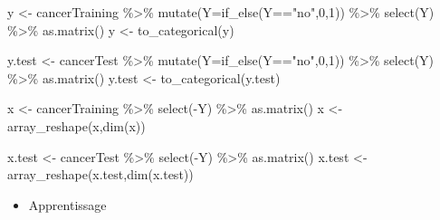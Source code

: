 \documentclass[
  12pt,
]{article}
\newenvironment{Shaded}{\begin{snugshade}}{\end{snugshade}}
\newcommand{\AttributeTok}[1]{\textcolor[rgb]{0.77,0.63,0.00}{#1}}
\newcommand{\DecValTok}[1]{\textcolor[rgb]{0.00,0.00,0.81}{#1}}
\newcommand{\FunctionTok}[1]{\textcolor[rgb]{0.00,0.00,0.00}{#1}}
\newcommand{\NormalTok}[1]{#1}
\newcommand{\OtherTok}[1]{\textcolor[rgb]{0.56,0.35,0.01}{#1}}
\newcommand{\SpecialCharTok}[1]{\textcolor[rgb]{0.00,0.00,0.00}{#1}}
\newcommand{\StringTok}[1]{\textcolor[rgb]{0.31,0.60,0.02}{#1}}
\providecommand{\tightlist}{%
  \setlength{\itemsep}{0pt}\setlength{\parskip}{0pt}}
\begin{document}
\begin{Shaded}
\begin{Highlighting}[]
\NormalTok{y }\OtherTok{\textless{}{-}}\NormalTok{  cancerTraining }\SpecialCharTok{\%\textgreater{}\%} 
  \FunctionTok{mutate}\NormalTok{(}\AttributeTok{Y=}\FunctionTok{if\_else}\NormalTok{(Y}\SpecialCharTok{==}\StringTok{"no"}\NormalTok{,}\DecValTok{0}\NormalTok{,}\DecValTok{1}\NormalTok{)) }\SpecialCharTok{\%\textgreater{}\%} 
  \FunctionTok{select}\NormalTok{(Y)  }\SpecialCharTok{\%\textgreater{}\%} 
  \FunctionTok{as.matrix}\NormalTok{()}
\NormalTok{y }\OtherTok{\textless{}{-}} \FunctionTok{to\_categorical}\NormalTok{(y)}

\NormalTok{y.test }\OtherTok{\textless{}{-}}\NormalTok{  cancerTest }\SpecialCharTok{\%\textgreater{}\%} 
  \FunctionTok{mutate}\NormalTok{(}\AttributeTok{Y=}\FunctionTok{if\_else}\NormalTok{(Y}\SpecialCharTok{==}\StringTok{"no"}\NormalTok{,}\DecValTok{0}\NormalTok{,}\DecValTok{1}\NormalTok{)) }\SpecialCharTok{\%\textgreater{}\%} 
  \FunctionTok{select}\NormalTok{(Y) }\SpecialCharTok{\%\textgreater{}\%} 
  \FunctionTok{as.matrix}\NormalTok{()}
\NormalTok{y.test }\OtherTok{\textless{}{-}} \FunctionTok{to\_categorical}\NormalTok{(y.test)}


\NormalTok{x }\OtherTok{\textless{}{-}}\NormalTok{ cancerTraining }\SpecialCharTok{\%\textgreater{}\%} 
  \FunctionTok{select}\NormalTok{(}\SpecialCharTok{{-}}\NormalTok{Y) }\SpecialCharTok{\%\textgreater{}\%} 
  \FunctionTok{as.matrix}\NormalTok{()}
\NormalTok{x }\OtherTok{\textless{}{-}} \FunctionTok{array\_reshape}\NormalTok{(x,}\FunctionTok{dim}\NormalTok{(x))}

\NormalTok{x.test }\OtherTok{\textless{}{-}}\NormalTok{ cancerTest }\SpecialCharTok{\%\textgreater{}\%} 
  \FunctionTok{select}\NormalTok{(}\SpecialCharTok{{-}}\NormalTok{Y) }\SpecialCharTok{\%\textgreater{}\%} 
  \FunctionTok{as.matrix}\NormalTok{()}
\NormalTok{x.test }\OtherTok{\textless{}{-}} \FunctionTok{array\_reshape}\NormalTok{(x.test,}\FunctionTok{dim}\NormalTok{(x.test))}
\end{Highlighting}
\end{Shaded}

\begin{itemize}
\tightlist
\item
  Apprentissage
\end{itemize}
\end{document}
